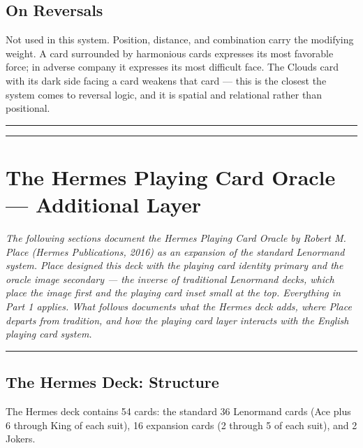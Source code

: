 \section{On Reversals}\label{on-reversals}

Not used in this system. Position, distance, and combination carry the modifying weight. A card surrounded by harmonious cards expresses its most favorable force; in adverse company it expresses its most difficult face. The Clouds card with its dark side facing a card weakens that card --- this is the closest the system comes to reversal logic, and it is spatial and relational rather than positional.

\begin{center}\rule{0.5\linewidth}{0.5pt}\end{center}

\begin{center}\rule{0.5\linewidth}{0.5pt}\end{center}

\chapter{The Hermes Playing Card Oracle --- Additional Layer}\label{the-hermes-playing-card-oracle--additional-layer}

\emph{The following sections document the Hermes Playing Card Oracle by Robert M. Place (Hermes Publications, 2016) as an expansion of the standard Lenormand system. Place designed this deck with the playing card identity primary and the oracle image secondary --- the inverse of traditional Lenormand decks, which place the image first and the playing card inset small at the top. Everything in Part 1 applies. What follows documents what the Hermes deck adds, where Place departs from tradition, and how the playing card layer interacts with the English playing card system.}

\begin{center}\rule{0.5\linewidth}{0.5pt}\end{center}

\section{The Hermes Deck: Structure}\label{the-hermes-deck-structure}

The Hermes deck contains 54 cards: the standard 36 Lenormand cards (Ace plus 6 through King of each suit), 16 expansion cards (2 through 5 of each suit), and 2 Jokers.

